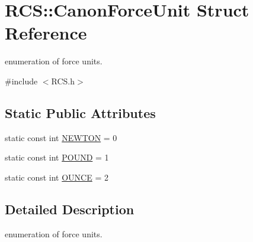 \hypertarget{structRCS_1_1CanonForceUnit}{\section{R\-C\-S\-:\-:Canon\-Force\-Unit Struct Reference}
\label{structRCS_1_1CanonForceUnit}
}


enumeration of force units.  




{\ttfamily \#include $<$R\-C\-S.\-h$>$}

\subsection*{Static Public Attributes}
\begin{DoxyCompactItemize}
\item 
static const int \hyperlink{structRCS_1_1CanonForceUnit_ae8e79a912a37f8a9db6032d19ccc287c}{N\-E\-W\-T\-O\-N} = 0
\item 
static const int \hyperlink{structRCS_1_1CanonForceUnit_aad5ded62a2efda9b07cab8ceabf9fbda}{P\-O\-U\-N\-D} = 1
\item 
static const int \hyperlink{structRCS_1_1CanonForceUnit_a87cc19b98cb94276d9ee6372ddd128d4}{O\-U\-N\-C\-E} = 2
\end{DoxyCompactItemize}


\subsection{Detailed Description}
enumeration of force units. 

